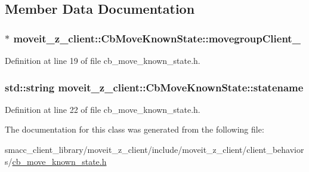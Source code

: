 \subsection{Member Data Documentation}
\subsubsection[{\texorpdfstring{movegroup\+Client\+\_\+}{movegroupClient_}}]{$\ast$ moveit\+\_\+z\+\_\+client\+::\+Cb\+Move\+Known\+State\+::movegroup\+Client\+\_\+\hspace{0.3cm}{\ttfamily [protected]}}\hypertarget{classmoveit__z__client_1_1CbMoveKnownState_a474f1470f8714411a676b9341a95130e}{}\label{classmoveit__z__client_1_1CbMoveKnownState_a474f1470f8714411a676b9341a95130e}


Definition at line 19 of file cb\+\_\+move\+\_\+known\+\_\+state.\+h.

\subsubsection[{\texorpdfstring{statename}{statename}}]{\setlength{\rightskip}{0pt plus 5cm}std\+::string moveit\+\_\+z\+\_\+client\+::\+Cb\+Move\+Known\+State\+::statename}\hypertarget{classmoveit__z__client_1_1CbMoveKnownState_a53449b08ffa077adb2f1d4efbd37f8d0}{}\label{classmoveit__z__client_1_1CbMoveKnownState_a53449b08ffa077adb2f1d4efbd37f8d0}


Definition at line 22 of file cb\+\_\+move\+\_\+known\+\_\+state.\+h.



The documentation for this class was generated from the following file\+:\begin{DoxyCompactItemize}
\item 
smacc\+\_\+client\+\_\+library/moveit\+\_\+z\+\_\+client/include/moveit\+\_\+z\+\_\+client/client\+\_\+behaviors/\hyperlink{cb__move__known__state_8h}{cb\+\_\+move\+\_\+known\+\_\+state.\+h}\end{DoxyCompactItemize}
